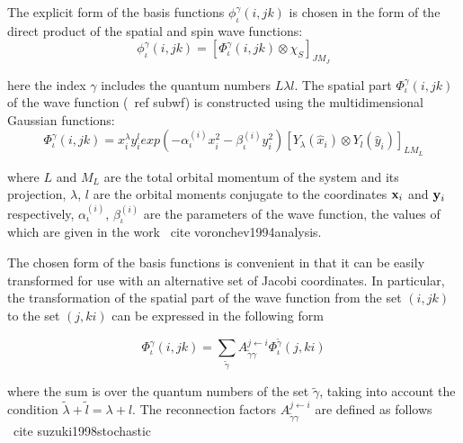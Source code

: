 \documentclass[12pt,a4paper,twoside]{article}
\begin{document}
The explicit form of the basis functions $ \phi_{\iota}^{\gamma} \left (i, jk \right) $ is chosen in the form of the direct product of the spatial and spin wave functions:
\begin{equation}
\phi_{\iota}^{\gamma}\left(i,jk\right) = \left[ \Phi_{\iota}^{\gamma} \left( i,jk \right) 
\otimes \chi_{S} \right] _{JM_{J}}
\label{subwf}
\end{equation}

here the index $\gamma$ includes the quantum numbers $L \lambda l $. The spatial part $\Phi_{\iota}^{\gamma} \left(i, jk \right) $ of the wave function (\ ref {subwf}) is constructed using the multidimensional Gaussian functions:
 \begin{equation}
 \Phi_{\iota}^{\gamma} \left( i,jk \right) =
 x_{i}^{\lambda} y_{i}^{l} exp\left(- \alpha^{(i)}_{\iota} x_{i}^{2} - \beta^{(i)}_{\iota}  y_{i}^{2} \right) 
 \left[ Y_\lambda \left(  \hat{x}_i \right) \otimes Y_l \left( \hat{y}_i \right) \right]_{LM_L} 
 \end{equation}
 
 where $ L $ and $ M_L $ are the total orbital momentum of the system and its projection, $ \lambda $, $ l $ are the orbital moments conjugate to the coordinates $ {\bf x} _i $ and $ {\bf y} _i $ respectively, $ \alpha^{(i)} _ {\iota} $, $ \beta^{(i)}_{\iota}$ are the parameters of the wave function, the values of which are given in the work \ cite {voronchev1994analysis}.
 
 The chosen form of the basis functions is convenient in that it can be easily transformed for use with an alternative set of Jacobi coordinates.
 In particular, the transformation of the spatial part of the wave function from the set $ \left(i, jk \right) $ to the set $ \left(j, ki \right) $ can be expressed in the following form
 
  \begin{equation}
 \label{transformbasisfunction}
 \Phi_{\iota}^{\gamma} \left( i,jk \right) = \sum_{\tilde{\gamma}} A_{\tilde{\gamma}\gamma}^{j\leftarrow i}
  \Phi_{\iota}^{\tilde{\gamma} } \left( j,ki \right) 
 \end{equation}
 
 where the sum is over the quantum numbers of the set $ \tilde {\gamma} $, taking into account the condition $ \tilde{\lambda} + \tilde{l} = \lambda + l $. The reconnection factors $ A_{\tilde{\gamma} \gamma}^{j \leftarrow i} $ are defined as follows \ cite {suzuki1998stochastic}
 
\end{document}
